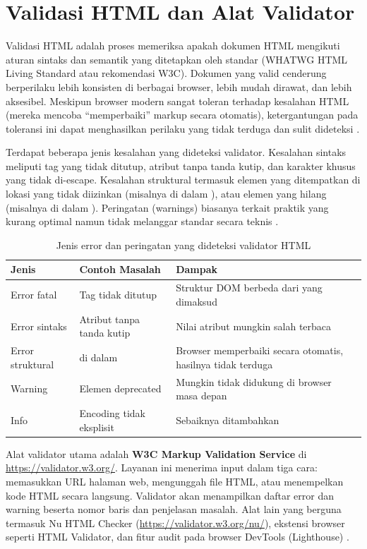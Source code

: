 ﻿\section{Validasi HTML dan Alat Validator}

Validasi HTML adalah proses memeriksa apakah dokumen HTML mengikuti aturan sintaks dan semantik yang ditetapkan oleh standar (WHATWG HTML Living Standard atau rekomendasi W3C). Dokumen yang valid cenderung berperilaku lebih konsisten di berbagai browser, lebih mudah dirawat, dan lebih aksesibel. Meskipun browser modern sangat toleran terhadap kesalahan HTML (mereka mencoba ``memperbaiki'' markup secara otomatis), ketergantungan pada toleransi ini dapat menghasilkan perilaku yang tidak terduga dan sulit dideteksi \cite{w3cValidator}.

Terdapat beberapa jenis kesalahan yang dideteksi validator. Kesalahan sintaks meliputi tag yang tidak ditutup, atribut tanpa tanda kutip, dan karakter khusus yang tidak di-escape. Kesalahan struktural termasuk elemen yang ditempatkan di lokasi yang tidak diizinkan (misalnya  di dalam ), atau elemen yang hilang (misalnya  di dalam ). Peringatan (warnings) biasanya terkait praktik yang kurang optimal namun tidak melanggar standar secara teknis \cite{whatwgHtml}.

\begin{table}[H]
\centering
\begin{tabular}{|P{2.5cm}|P{4cm}|P{5.5cm}|}
\hline
\textbf{Jenis} & \textbf{Contoh Masalah} & \textbf{Dampak} \\
\hline
Error fatal & Tag tidak ditutup & Struktur DOM berbeda dari yang dimaksud \\
\hline
Error sintaks & Atribut tanpa tanda kutip & Nilai atribut mungkin salah terbaca \\
\hline
Error struktural &  di dalam  & Browser memperbaiki secara otomatis, hasilnya tidak terduga \\
\hline
Warning & Elemen deprecated & Mungkin tidak didukung di browser masa depan \\
\hline
Info & Encoding tidak eksplisit & Sebaiknya ditambahkan  \\
\hline
\end{tabular}
\caption{Jenis error dan peringatan yang dideteksi validator HTML}
\end{table}

Alat validator utama adalah \textbf{W3C Markup Validation Service} di \url{https://validator.w3.org/}. Layanan ini menerima input dalam tiga cara: memasukkan URL halaman web, mengunggah file HTML, atau menempelkan kode HTML secara langsung. Validator akan menampilkan daftar error dan warning beserta nomor baris dan penjelasan masalah. Alat lain yang berguna termasuk Nu HTML Checker (\url{https://validator.w3.org/nu/}), ekstensi browser seperti HTML Validator, dan fitur audit pada browser DevTools (Lighthouse) \cite{w3cValidator}.

